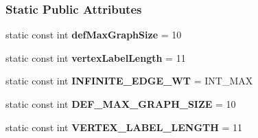 \subsubsection*{Static Public Attributes}
\begin{DoxyCompactItemize}
\item 
static const int {\bfseries def\+Max\+Graph\+Size} = 10\hypertarget{class_weighted_graph_a126ff6aa1d4ab79c67491e1847fd1126}{}\label{class_weighted_graph_a126ff6aa1d4ab79c67491e1847fd1126}

\item 
static const int {\bfseries vertex\+Label\+Length} = 11\hypertarget{class_weighted_graph_a1c888219c6dd8aff12519f368a415d5a}{}\label{class_weighted_graph_a1c888219c6dd8aff12519f368a415d5a}

\item 
static const int {\bfseries I\+N\+F\+I\+N\+I\+T\+E\+\_\+\+E\+D\+G\+E\+\_\+\+WT} = I\+N\+T\+\_\+\+M\+AX\hypertarget{class_weighted_graph_a5d4e3055fcccb2f50667bcd588dd8af7}{}\label{class_weighted_graph_a5d4e3055fcccb2f50667bcd588dd8af7}

\item 
static const int {\bfseries D\+E\+F\+\_\+\+M\+A\+X\+\_\+\+G\+R\+A\+P\+H\+\_\+\+S\+I\+ZE} = 10\hypertarget{class_weighted_graph_ab8b56b138f61133fe3833f96c318568e}{}\label{class_weighted_graph_ab8b56b138f61133fe3833f96c318568e}

\item 
static const int {\bfseries V\+E\+R\+T\+E\+X\+\_\+\+L\+A\+B\+E\+L\+\_\+\+L\+E\+N\+G\+TH} = 11\hypertarget{class_weighted_graph_a19411776f4ee4e2a68bf2bc5e03aa10b}{}\label{class_weighted_graph_a19411776f4ee4e2a68bf2bc5e03aa10b}

\end{DoxyCompactItemize}

